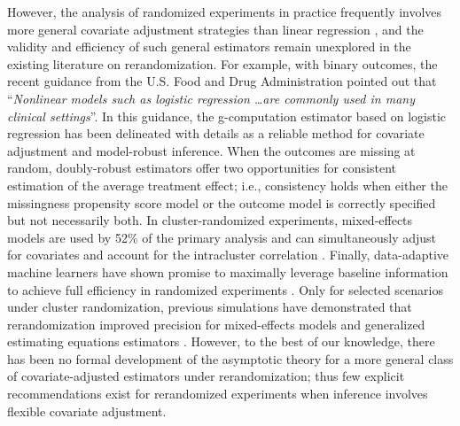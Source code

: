 \documentclass[12pt]{article}
\begin{document}
However, the analysis of randomized experiments in practice frequently involves more general covariate adjustment strategies than linear regression \citep{benkeser2021improving}, and the validity and efficiency of such general estimators remain unexplored in the existing literature on rerandomization. For example, with binary outcomes, the recent guidance from the U.S. Food and Drug Administration \citep{FDA2023} pointed out that ``\emph{Nonlinear models such as logistic regression \dots are commonly used in many clinical settings}''. In this guidance, the g-computation estimator based on logistic regression has been delineated with details as a reliable method for covariate adjustment and model-robust inference.
When the outcomes are missing at random, doubly-robust estimators \citep{robins2007} offer two opportunities for consistent estimation of the average treatment effect; i.e., consistency holds when either the missingness propensity score model or the outcome model is correctly specified but not necessarily both. In cluster-randomized experiments, mixed-effects models are used by 52\% of the primary analysis \citep{fiero2016statistical} and can simultaneously adjust for covariates and account for the intracluster correlation \citep{wang2021mixed}. Finally, data-adaptive machine learners have shown promise to maximally leverage baseline information to achieve full efficiency in randomized experiments 
\citep{chernozhukov2018double,wang2023CRT}. Only for selected scenarios under cluster randomization, previous simulations have demonstrated that rerandomization improved precision for mixed-effects models and generalized estimating equations estimators \citep{li2016evaluation, li2017evaluation}. However, to the best of our knowledge, there has been no formal development of the asymptotic theory for a more general class of covariate-adjusted estimators under rerandomization; thus few explicit recommendations exist for rerandomized experiments when inference involves flexible covariate adjustment.%
\end{document}
